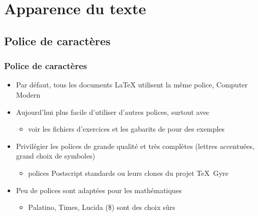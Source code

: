 \section{Apparence du texte}

\subsection{Police de caractères}

\begin{frame}
  \frametitle{Police de caractères}
  \begin{itemize}
  \item Par défaut, tous les documents {\LaTeX} utilisent la même
    police, {\selectfont Computer Modern}
  \item Aujourd'hui plus facile d'utiliser d'autres polices, surtout
    avec {\XeLaTeX}
    \begin{itemize}
    \item voir les fichiers d'exercices et les gabarits de
       pour des exemples
    \end{itemize}
  \item Privilégier les polices de grande qualité et très complètes
    (lettres accentuées, grand choix de symboles)
    \begin{itemize}
    \item polices Postscript standards ou leurs clones du projet
      TeX~Gyre
    \end{itemize}
  \item Peu de polices sont adaptées pour les mathématiques
    \begin{itemize}
    \item {\selectfont Palatino},
      {\selectfont Times}, \textrm{Lucida} (\$) sont des choix sûrs
    \end{itemize}
  \end{itemize}
\end{frame}

